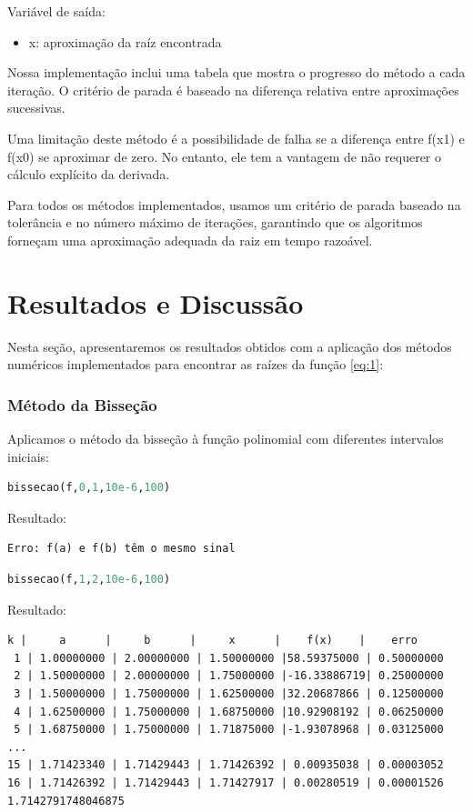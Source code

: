 \documentclass{article}
\begin{document}
Vari\'{a}vel de sa\'{i}da:
\begin{itemize}
    \item x: aproxima\c{c}\~{a}o da ra\'{i}z encontrada
\end{itemize}
Nossa implementação inclui uma tabela que mostra o progresso do método a cada iteração. O critério de parada é baseado na diferença relativa entre aproximações sucessivas.

Uma limitação deste método é a possibilidade de falha se a diferença entre f(x1) e f(x0) se aproximar de zero. No entanto, ele tem a vantagem de não requerer o cálculo explícito da derivada.

Para todos os métodos implementados, usamos um critério de parada baseado na tolerância e no número máximo de iterações, garantindo que os algoritmos forneçam uma aproximação adequada da raiz em tempo razoável.


\section{Resultados e Discuss\~{a}o}
Nesta se\c{c}\~{a}o, apresentaremos os resultados obtidos com a aplica\c{c}\~{a}o dos m\'{e}todos num\'{e}ricos implementados para encontrar as ra\'{i}zes da fun\c{c}\~{a}o \eqref{eq:1}:

\subsubsection{Método da Bisseção}
Aplicamos o método da bisseção à função polinomial com diferentes intervalos iniciais:

\begin{lstlisting}[language=Python]
bissecao(f,0,1,10e-6,100)
\end{lstlisting}

Resultado:
\begin{verbatim}
Erro: f(a) e f(b) têm o mesmo sinal
\end{verbatim}

\begin{lstlisting}[language=Python]
bissecao(f,1,2,10e-6,100)
\end{lstlisting}

Resultado:
\begin{verbatim}
k |     a      |     b      |     x      |    f(x)    |    erro    
 1 | 1.00000000 | 2.00000000 | 1.50000000 |58.59375000 | 0.50000000 
 2 | 1.50000000 | 2.00000000 | 1.75000000 |-16.33886719| 0.25000000 
 3 | 1.50000000 | 1.75000000 | 1.62500000 |32.20687866 | 0.12500000 
 4 | 1.62500000 | 1.75000000 | 1.68750000 |10.92908192 | 0.06250000 
 5 | 1.68750000 | 1.75000000 | 1.71875000 |-1.93078968 | 0.03125000 
...
15 | 1.71423340 | 1.71429443 | 1.71426392 | 0.00935038 | 0.00003052 
16 | 1.71426392 | 1.71429443 | 1.71427917 | 0.00280519 | 0.00001526 
1.7142791748046875
\end{verbatim}
\end{document}
